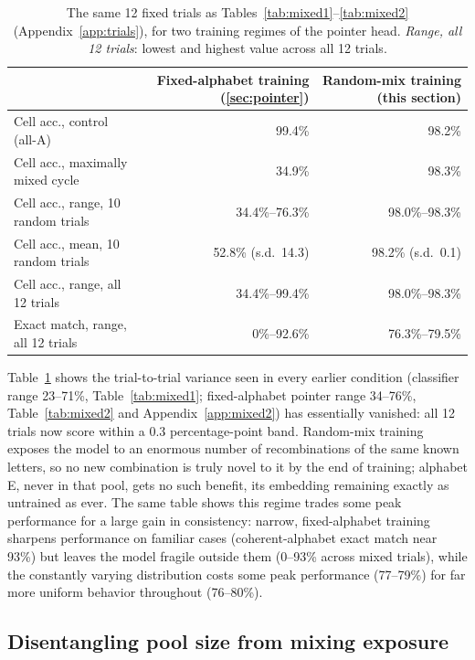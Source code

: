 \documentclass{article} %
\begin{document}
\begin{table}[h]
\centering
\footnotesize
\begin{tabular}{lrr}
\hline
 & Fixed-alphabet training (\ref{sec:pointer}) & Random-mix training (this section) \\
\hline
Cell acc., control (all-A) & 99.4\% & 98.2\% \\
Cell acc., maximally mixed cycle & 34.9\% & 98.3\% \\
Cell acc., range, 10 random trials & 34.4\%--76.3\% & 98.0\%--98.3\% \\
Cell acc., mean, 10 random trials & 52.8\% (s.d.\ 14.3) & 98.2\% (s.d.\ 0.1) \\
Cell acc., range, all 12 trials & 34.4\%--99.4\% & 98.0\%--98.3\% \\
Exact match, range, all 12 trials & 0\%--92.6\% & 76.3\%--79.5\% \\
\hline
\end{tabular}
\caption{The same 12 fixed trials as Tables~\ref{tab:mixed1}--\ref{tab:mixed2}
(Appendix~\ref{app:trials}), for two training regimes of the pointer
head. \emph{Range, all 12 trials}: lowest and highest value across all
12 trials.}
\label{tab:diversity2-mixed}
\end{table}

Table~\ref{tab:diversity2-mixed} shows the trial-to-trial variance seen
in every earlier condition (classifier range 23--71\%, Table~\ref{tab:mixed1};
fixed-alphabet pointer range 34--76\%, Table~\ref{tab:mixed2} and
Appendix~\ref{app:mixed2}) has essentially vanished: all 12 trials now
score within a 0.3 percentage-point band. Random-mix training exposes
the model to an enormous number of recombinations of the same known
letters, so no new combination is truly novel to it by the end of
training; alphabet E, never in that pool, gets no such benefit, its
embedding remaining exactly as untrained as ever. The same table shows
this regime trades some peak performance for a large gain in
consistency: narrow, fixed-alphabet training sharpens performance on
familiar cases (coherent-alphabet exact match near 93\%) but leaves the
model fragile outside them (0--93\% across mixed trials), while the
constantly varying distribution costs some peak performance (77--79\%)
for far more uniform behavior throughout (76--80\%).

\subsection{Disentangling pool size from mixing exposure}
\label{sec:disentangle}
\end{document}
